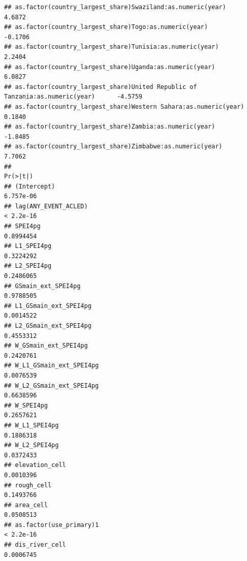 \documentclass[
  a4paper,
]{article}
\begin{document}
\begin{verbatim}
## as.factor(country_largest_share)Swaziland:as.numeric(year)                         4.6872
## as.factor(country_largest_share)Togo:as.numeric(year)                             -0.1706
## as.factor(country_largest_share)Tunisia:as.numeric(year)                           2.2404
## as.factor(country_largest_share)Uganda:as.numeric(year)                            6.0827
## as.factor(country_largest_share)United Republic of Tanzania:as.numeric(year)      -4.5759
## as.factor(country_largest_share)Western Sahara:as.numeric(year)                    0.1840
## as.factor(country_largest_share)Zambia:as.numeric(year)                           -1.8485
## as.factor(country_largest_share)Zimbabwe:as.numeric(year)                          7.7062
##                                                                                    Pr(>|t|)
## (Intercept)                                                                       6.757e-06
## lag(ANY_EVENT_ACLED)                                                              < 2.2e-16
## SPEI4pg                                                                           0.8994454
## L1_SPEI4pg                                                                        0.3224292
## L2_SPEI4pg                                                                        0.2486065
## GSmain_ext_SPEI4pg                                                                0.9788505
## L1_GSmain_ext_SPEI4pg                                                             0.0014522
## L2_GSmain_ext_SPEI4pg                                                             0.4553312
## W_GSmain_ext_SPEI4pg                                                              0.2420761
## W_L1_GSmain_ext_SPEI4pg                                                           0.0076539
## W_L2_GSmain_ext_SPEI4pg                                                           0.6638596
## W_SPEI4pg                                                                         0.2657621
## W_L1_SPEI4pg                                                                      0.1886318
## W_L2_SPEI4pg                                                                      0.0372433
## elevation_cell                                                                    0.0010396
## rough_cell                                                                        0.1493766
## area_cell                                                                         0.0508513
## as.factor(use_primary)1                                                           < 2.2e-16
## dis_river_cell                                                                    0.0006745

\end{verbatim}
\end{document}
